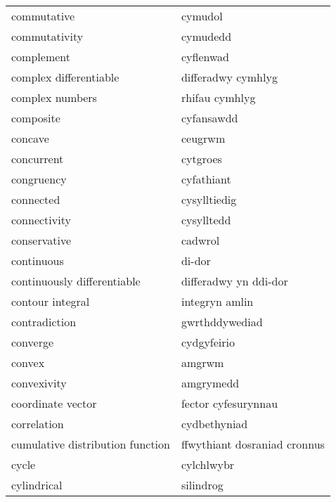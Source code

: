 \begin{supertabular}{p{0.22\textwidth}p{0.22\textwidth}}
                      commutative &                          cymudol \\
                    commutativity &                         cymudedd \\
                       complement &                        cyflenwad \\
           complex differentiable &               differadwy cymhlyg \\
                  complex numbers &                   rhifau cymhlyg \\
                        composite &                       cyfansawdd \\
                          concave &                          ceugrwm \\
                       concurrent &                         cytgroes \\
                       congruency &                       cyfathiant \\
                        connected &                     cysylltiedig \\
                     connectivity &                       cysylltedd \\
                     conservative &                          cadwrol \\
                       continuous &                           di-dor \\
      continuously differentiable &            differadwy yn ddi-dor \\
                 contour integral &                   integryn amlin \\
                    contradiction &                   gwrthddywediad \\
                         converge &                      cydgyfeirio \\
                           convex &                           amgrwm \\
                      convexivity &                        amgrymedd \\
                coordinate vector &              fector cyfesurynnau \\
                      correlation &                     cydbethyniad \\
 cumulative distribution function &     ffwythiant dosraniad cronnus \\
                            cycle &                       cylchlwybr \\
                      cylindrical &                        silindrog \\

\end{supertabular}
